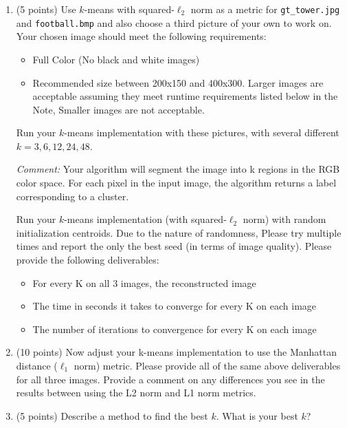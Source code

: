 \documentclass[twoside,10pt]{article}
\begin{document}
\begin{enumerate}
 
\item  (5 points) Use $k$-means with squared-$\ell_2$ norm as a metric for \texttt{gt\_tower.jpg} and \texttt{football.bmp} and also choose a third picture of your own to work on. Your chosen image should meet the following requirements: 
\begin{itemize}
    \item Full Color (No black and white images)
    \item Recommended size between 200x150 and 400x300. Larger images are acceptable assuming they meet runtime requirements listed below in the Note, Smaller images are not acceptable.
\end{itemize}
Run your $k$-means implementation with these pictures, with several different $k = 3, 6, 12, 24, 48$.
  
{\it Comment:}  Your algorithm will segment the image into k regions in the RGB color space. For each pixel in the input image, the algorithm returns a label corresponding to a cluster.
  
Run your $k$-means implementation (with squared-$\ell_2$ norm) with random initialization centroids. Due to the nature of randomness, Please try multiple times and report the only the best seed (in terms of image quality). Please provide the following deliverables:
\begin{itemize}
    \item For every K on all 3 images, the reconstructed image
    \item The time in seconds it takes to converge for every K on each image
    \item The number of iterations to convergence for every K on each image
\end{itemize}
  
\item (10 points) Now adjust your k-means implementation to use the Manhattan distance ($\ell_1$ norm) metric. Please provide all of the same above deliverables for all three images. Provide a comment on any differences you see in the results between using the L2 norm and L1 norm metrics.

\item (5 points) Describe a method to find the best $k$. What is your best $k$?

\end{enumerate}
  
\end{document}
